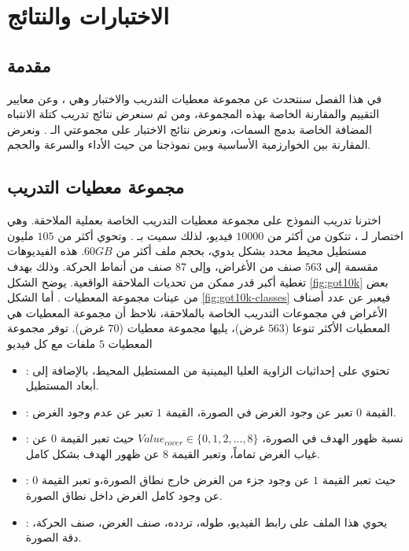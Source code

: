 \chapter{الاختبارات والنتائج}
\section{مقدمة}
في هذا الفصل سنتحدث عن مجموعة معطيات التدريب والاختبار وهي
،
وعن معايير التقييم والمقارنة الخاصة بهذه المجموعة، ومن ثم سنعرض نتائج تدريب كتلة الانتباه المضافة الخاصة بدمج السمات، ونعرض نتائج الاختبار على مجموعتي الـ
.
ونعرض المقارنة بين الخوارزمية الأساسية 
وبين نموذجنا من حيث الأداء والسرعة والحجم.
\section{مجموعة معطيات التدريب 
}
اخترنا تدريب النموذج على مجموعة معطيات التدريب 
الخاصة بعملية الملاحقة.
وهي اختصار لـ
،
تتكون من أكثر من 
$10000$
فيديو، لذلك سميت بـ
.
وتحوي أكثر من 
$105$
مليون مستطيل محيط محدد بشكل يدوي، بحجم ملف أكثر من 
$60GB$.
\newline
هذه الفيديوهات مقسمة إلى 
$563$
صنف من الأغراض، وإلى 
$87$
صنف من أنماط الحركة. وذلك بهدف تغطية أكبر قدر ممكن من تحديات الملاحقة الواقعية.
يوضح الشكل 
\ref{fig:got10k}
بعض من عينات مجموعة المعطيات 
.
\newline
أما الشكل 
\ref{fig:got10k-classes}
فيعبر عن عدد أصناف الأغراض في مجموعات التدريب الخاصة بالملاحقة، نلاحظ أن مجموعة المعطيات
هي المعطيات الأكثر تنوعا ($563$ غرض)، يليها مجموعة معطيات 
($70$ غرض).
\newline
توفر مجموعة المعطيات $5$ ملفات مع كل فيديو
\begin{itemize}
\item {}:
تحتوي على إحداثيات الزاوية العليا اليمينية من المستطيل المحيط، بالإضافة إلى أبعاد المستطيل.
\item {}:
القيمة $0$ تعبر عن وجود الغرض في الصورة، القيمة $1$ تعبر عن عدم وجود الغرض.
\item {}:
نسبة ظهور الهدف في الصورة،
$Value_{cover} \in \{0,1,2,...,8\}$
حيث تعبر القيمة $0$ عن غياب الغرض تماماً، وتعبر القيمة $8$ عن ظهور الهدف بشكل كامل.
\item {}:
حيث تعبر القيمة
$1$ عن وجود جزء من الغرض خارج نطاق الصورة،و تعبر القيمة $0$ عن وجود  كامل الغرض داخل نطاق الصورة.  
\item {}:
يحوي هذا الملف على رابط الفيديو، طوله، تردده، صنف الغرض، صنف الحركة، دقة الصورة.
\end{itemize}

